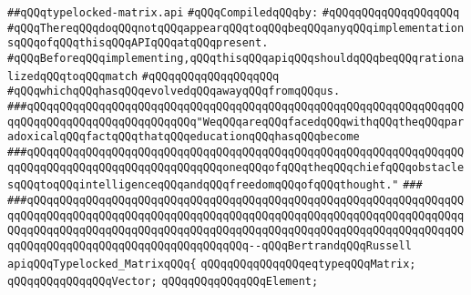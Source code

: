 \label{src/lib/std/src/typelocked-matrix.api}
\verb|##qQQqtypelocked-matrix.api|\newline
\newline
\verb|#qQQqCompiledqQQqby:|\newline
\verb|#qQQqqQQqqQQqqQQqqQQq|\newline
\newline
\verb|#qQQqThereqQQqdoqQQqnotqQQqappearqQQqtoqQQqbeqQQqanyqQQqimplementationsqQQqofqQQqthisqQQqAPIqQQqatqQQqpresent.|\newline
\verb|#qQQqBeforeqQQqimplementing,qQQqthisqQQqapiqQQqshouldqQQqbeqQQqrationalizedqQQqtoqQQqmatch|\newline
\verb|#qQQqqQQqqQQqqQQqqQQq|\newline
\verb|#qQQqwhichqQQqhasqQQqevolvedqQQqawayqQQqfromqQQqus.|\newline
\newline
\newline
\newline
\verb|###qQQqqQQqqQQqqQQqqQQqqQQqqQQqqQQqqQQqqQQqqQQqqQQqqQQqqQQqqQQqqQQqqQQqqQQqqQQqqQQqqQQqqQQqqQQqqQQq"WeqQQqareqQQqfacedqQQqwithqQQqtheqQQqparadoxicalqQQqfactqQQqthatqQQqeducationqQQqhasqQQqbecome|\newline
\verb|###qQQqqQQqqQQqqQQqqQQqqQQqqQQqqQQqqQQqqQQqqQQqqQQqqQQqqQQqqQQqqQQqqQQqqQQqqQQqqQQqqQQqqQQqqQQqqQQqqQQqoneqQQqofqQQqtheqQQqchiefqQQqobstaclesqQQqtoqQQqintelligenceqQQqandqQQqfreedomqQQqofqQQqthought."|\newline
\verb|###|\newline
\verb|###qQQqqQQqqQQqqQQqqQQqqQQqqQQqqQQqqQQqqQQqqQQqqQQqqQQqqQQqqQQqqQQqqQQqqQQqqQQqqQQqqQQqqQQqqQQqqQQqqQQqqQQqqQQqqQQqqQQqqQQqqQQqqQQqqQQqqQQqqQQqqQQqqQQqqQQqqQQqqQQqqQQqqQQqqQQqqQQqqQQqqQQqqQQqqQQqqQQqqQQqqQQqqQQqqQQqqQQqqQQqqQQqqQQqqQQqqQQqqQQqqQQq--qQQqBertrandqQQqRussell|\newline
\newline
\newline
\newline
\verb|apiqQQqTypelocked_MatrixqQQq{|\newline
\newline
\verb|qQQqqQQqqQQqqQQqeqtypeqQQqMatrix;|\newline
\verb|qQQqqQQqqQQqqQQqVector;|\newline
\verb|qQQqqQQqqQQqqQQqElement;|\newline
